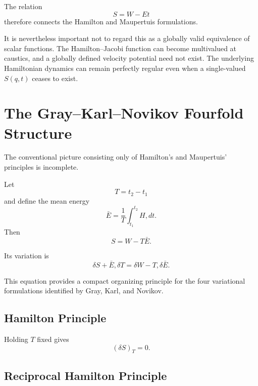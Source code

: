 The relation
\begin{equation}
S=W-Et
\end{equation}
therefore connects the Hamilton and Maupertuis formulations.

It is nevertheless important not to regard this as a globally valid equivalence of scalar functions.  The Hamilton--Jacobi function can become multivalued at caustics, and a globally defined velocity potential need not exist.  The underlying Hamiltonian dynamics can remain perfectly regular even when a single-valued $S(q,t)$ ceases to exist.

\section{The Gray--Karl--Novikov Fourfold Structure}

The conventional picture consisting only of Hamilton's and Maupertuis' principles is incomplete.

Let
\begin{equation}
T=t_2-t_1
\end{equation}
and define the mean energy
\begin{equation}
\bar E
=
\frac1T
\int_{t_1}^{t_2}H,dt.
\end{equation}
Then
\begin{equation}
\boxed{
S=W-T\bar E.
}
\label{eq:master-legendre}
\end{equation}

Its variation is
\begin{equation}
\boxed{
\delta S+\bar E,\delta T
=
\delta W-T,\delta\bar E.
}
\label{eq:master-variation}
\end{equation}

This equation provides a compact organizing principle for the four variational formulations identified by Gray, Karl, and Novikov.

\subsection{Hamilton Principle}

Holding $T$ fixed gives
\begin{equation}
\boxed{
(\delta S)_T=0.
}
\end{equation}

\subsection{Reciprocal Hamilton Principle}

